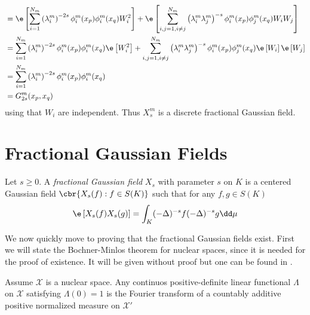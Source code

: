 \begin{example}
\begin{align}
		&= \e \left[\sum_{i=1}^{N_m}\left(\lambda_i^{m}\right)^{-2s}\phi^{m}_{i}(x_p)\phi^{m}_{i}(x_q)W_i^2\right] +\e \left[\sum_{i,j=1, i \neq j }^{N_m}\left(\lambda_i^{m}\lambda_j^{m}\right)^{-s}\phi^{m}_{i}(x_p) \phi^{m}_{j}(x_q)W_iW_j\right] \\
		&= \sum_{i=1}^{N_m}\left(\lambda_i^{m}\right)^{-2s}\phi^{m}_{i}(x_p)\phi^{m}_{i}(x_q)\e \left[W_i^2\right] +\sum_{i,j=1, i \neq j }^{N_m}\left(\lambda_i^{m}\lambda_j^{m}\right)^{-s}\phi^{m}_{i}(x_p) \phi^{m}_{j}(x_q)\e \left[W_i\right] \e \left[W_j\right] \\
		&= \sum_{i=1}^{N_m}\left(\lambda_i^{m}\right)^{-2s}\phi^{m}_{i}(x_p)\phi^{m}_{i}(x_q) \\
		&= G_{2s}^{m}(x_p,x_q)
	\end{align}
	using that $W_i$ are independent. Thus $X_s^{m}$ is a discrete fractional Gaussian field.
\end{example}

\section{Fractional Gaussian Fields}

\begin{defi}\label{fracGaussianField}
	Let $s \geq 0$. A \emph{fractional Gaussian field} $X_s$ with parameter $s$ on $K$ is a centered Gaussian field $\cbr{X_s(f): f \in S(K)}$ such that for any $f,g \in S(K)$
	\begin{equation}
		\e \left[X_s(f) X_s(g)\right] = \int_{K} (-\Delta)^{-s}f (-\Delta)^{-s}g \dd \mu
	\end{equation}
\end{defi}

We now quickly move to proving that the fractional Gaussian fields exist. First we will state the Bochner-Minlos theorem for nuclear spaces, since it is needed for the proof of existence. It will be given without proof but one can be found in \cite{minlos}.

\begin{theorem}\label{BochnerMinlos}
	Assume $\mathcal{X}$ is a nuclear space. Any continuos positive-definite linear functional $\Lambda$ on $\mathcal{X}$ satisfying $\Lambda(0) = 1$ is the Fourier transform of a countably additive positive normalized measure on $\mathcal{X}'$
\end{theorem}


